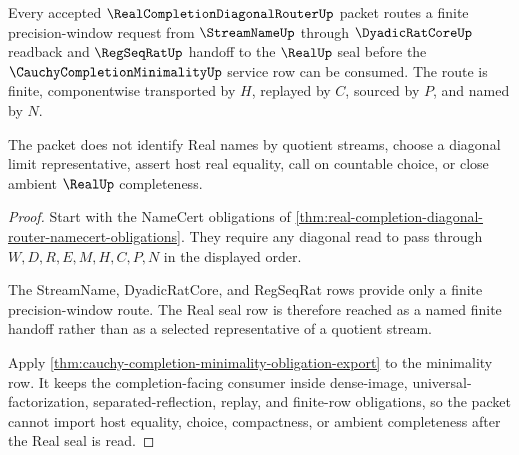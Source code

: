 \begin{theorem}
\label{thm:real-completion-diagonal-router-precision-window-route}
Every accepted $\RealCompletionDiagonalRouterUp$ packet routes a finite precision-window request from $\StreamNameUp$ through $\DyadicRatCoreUp$ readback and $\RegSeqRatUp$ handoff to the $\RealUp$ seal before the $\CauchyCompletionMinimalityUp$ service row can be consumed. The route is finite, componentwise transported by $H$, replayed by $C$, sourced by $P$, and named by $N$.

The packet does not identify Real names by quotient streams, choose a diagonal limit representative, assert host real equality, call on countable choice, or close ambient $\RealUp$ completeness.
\end{theorem}
\begin{proof}
Start with the NameCert obligations of \autoref{thm:real-completion-diagonal-router-namecert-obligations}. They require any diagonal read to pass through $W,D,R,E,M,H,C,P,N$ in the displayed order.

The StreamName, DyadicRatCore, and RegSeqRat rows provide only a finite precision-window route. The Real seal row is therefore reached as a named finite handoff rather than as a selected representative of a quotient stream.

Apply \autoref{thm:cauchy-completion-minimality-obligation-export} to the minimality row. It keeps the completion-facing consumer inside dense-image, universal-factorization, separated-reflection, replay, and finite-row obligations, so the packet cannot import host equality, choice, compactness, or ambient completeness after the Real seal is read.
\end{proof}

\begin{closurestatus}{\RealCompletionDiagonalRouterUp}
  \theoryclosure{\seedClosure}
  \formalstatus{\unformalizedV}
\end{closurestatus}
